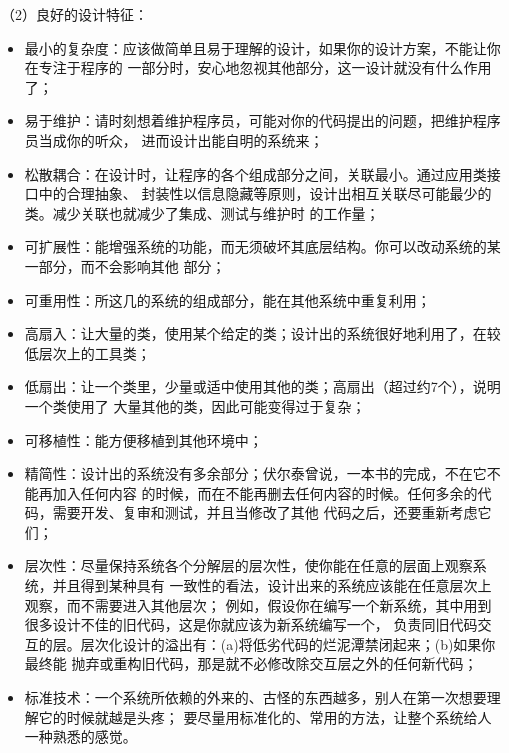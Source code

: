 \documentclass{article}
\begin{document}
\par
（2）良好的设计特征：
\begin{itemize}
    \item 最小的复杂度：应该做简单且易于理解的设计，如果你的设计方案，不能让你在专注于程序的
    一部分时，安心地忽视其他部分，这一设计就没有什么作用了；
    \item 易于维护：请时刻想着维护程序员，可能对你的代码提出的问题，把维护程序员当成你的听众，
    进而设计出能自明的系统来；
    \item 松散耦合：在设计时，让程序的各个组成部分之间，关联最小。通过应用类接口中的合理抽象、
    封装性以信息隐藏等原则，设计出相互关联尽可能最少的类。减少关联也就减少了集成、测试与维护时
    的工作量；
    \item 可扩展性：能增强系统的功能，而无须破坏其底层结构。你可以改动系统的某一部分，而不会影响其他
    部分；
    \item 可重用性：所这几的系统的组成部分，能在其他系统中重复利用；
    \item 高扇入：让大量的类，使用某个给定的类；设计出的系统很好地利用了，在较低层次上的工具类；
    \item 低扇出：让一个类里，少量或适中使用其他的类；高扇出（超过约7个），说明一个类使用了
    大量其他的类，因此可能变得过于复杂；
    \item 可移植性：能方便移植到其他环境中；
    \item 精简性：设计出的系统没有多余部分；伏尔泰曾说，一本书的完成，不在它不能再加入任何内容
    的时候，而在不能再删去任何内容的时候。任何多余的代码，需要开发、复审和测试，并且当修改了其他
    代码之后，还要重新考虑它们；
    \item 层次性：尽量保持系统各个分解层的层次性，使你能在任意的层面上观察系统，并且得到某种具有
    一致性的看法，设计出来的系统应该能在任意层次上观察，而不需要进入其他层次；
    例如，假设你在编写一个新系统，其中用到很多设计不佳的旧代码，这是你就应该为新系统编写一个，
    负责同旧代码交互的层。层次化设计的溢出有：(a)将低劣代码的烂泥潭禁闭起来；(b)如果你最终能
    抛弃或重构旧代码，那是就不必修改除交互层之外的任何新代码；
    \item 标准技术：一个系统所依赖的外来的、古怪的东西越多，别人在第一次想要理解它的时候就越是头疼；
    要尽量用标准化的、常用的方法，让整个系统给人一种熟悉的感觉。
\end{itemize}
\end{document}
